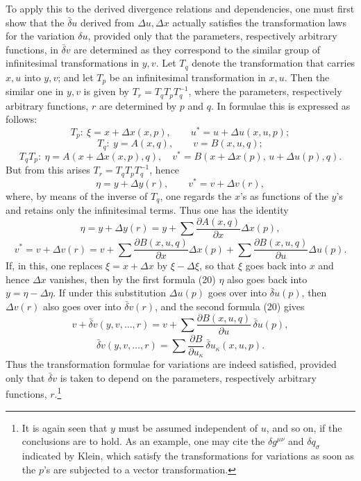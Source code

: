 \documentclass[11pt]{article}
\newcommand{\D}{\Delta}
\providecommand{\bd}{\bar{\delta}}
\providecommand{\p}{\partial}
\begin{document}
To apply this to the derived divergence relations and dependencies, one must first show that the \(\bd u\) derived from \(\D u,\D x\) actually satisfies the transformation laws for the variation \(\delta u\), provided only that the parameters, respectively arbitrary functions, in \(\bd v\) are determined as they correspond to the similar group of infinitesimal transformations in \(y,v\). Let \(T_q\) denote the transformation that carries \(x,u\) into \(y,v\); and let \(T_p\) be an infinitesimal transformation in \(x,u\). Then the similar one in \(y,v\) is given by \(T_r=T_qT_pT_q^{-1}\), where the parameters, respectively arbitrary functions, \(r\) are determined by \(p\) and \(q\). In formulae this is expressed as follows:
\[
T_p:\ \xi=x+\D x(x,p),\qquad u^*=u+\D u(x,u,p);
\]
\[
T_q:\ y=A(x,q),\qquad v=B(x,u,q);
\]
\[
T_qT_p:\ \eta=A(x+\D x(x,p),q),\quad
v^*=B(x+\D x(p),\,u+\D u(p),q).
\]
But from this arises \(T_r=T_qT_pT_q^{-1}\), hence
\[
\eta=y+\D y(r),\qquad v^*=v+\D v(r),
\]
where, by means of the inverse of \(T_q\), one regards the \(x\)'s as functions of the \(y\)'s and retains only the infinitesimal terms. Thus one has the identity
\begin{equation}
\eta=y+\D y(r)=y+\sum\frac{\p A(x,q)}{\p x}\D x(p),
\tag{20a}
\end{equation}
\begin{equation}
v^*=v+\D v(r)=v+\sum\frac{\p B(x,u,q)}{\p x}\D x(p)
+\sum\frac{\p B(x,u,q)}{\p u}\D u(p).
\tag{20b}
\end{equation}
If, in this, one replaces \(\xi=x+\D x\) by \(\xi-\D \xi\), so that \(\xi\) goes back into \(x\) and hence \(\D x\) vanishes, then by the first formula (20) \(\eta\) also goes back into \(y=\eta-\D\eta\). If under this substitution \(\D u(p)\) goes over into \(\bd u(p)\), then \(\D v(r)\) also goes over into \(\bd v(r)\), and the second formula (20) gives
\[
v+\bd v(y,v,\ldots,r)=v+\sum\frac{\p B(x,u,q)}{\p u}\,\bd u(p),
\]
\[
\bd v(y,v,\ldots,r)=\sum\frac{\p B}{\p u_\kappa}\,\bd u_\kappa(x,u,p).
\]
Thus the transformation formulae for variations are indeed satisfied, provided only that \(\bd v\) is taken to depend on the parameters, respectively arbitrary functions, \(r\).\footnote{It is again seen that \(y\) must be assumed independent of \(u\), and so on, if the conclusions are to hold. As an example, one may cite the \(\delta g^{\mu\nu}\) and \(\delta q_\sigma\) indicated by Klein, which satisfy the transformations for variations as soon as the \(p\)'s are subjected to a vector transformation.}
\end{document}
